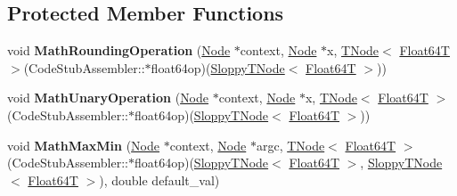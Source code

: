 \subsection*{Protected Member Functions}
\begin{DoxyCompactItemize}
\item 
\mbox{\label{classv8_1_1internal_1_1MathBuiltinsAssembler_aa9c614006a116b3c4ca0d12038b56ad7}} 
void {\bfseries Math\+Rounding\+Operation} (\mbox{\hyperlink{classv8_1_1internal_1_1compiler_1_1Node}{Node}} $\ast$context, \mbox{\hyperlink{classv8_1_1internal_1_1compiler_1_1Node}{Node}} $\ast$x, \mbox{\hyperlink{classv8_1_1internal_1_1compiler_1_1TNode}{T\+Node}}$<$ \mbox{\hyperlink{structv8_1_1internal_1_1Float64T}{Float64T}} $>$(Code\+Stub\+Assembler\+::$\ast$float64op)(\mbox{\hyperlink{classv8_1_1internal_1_1compiler_1_1SloppyTNode}{Sloppy\+T\+Node}}$<$ \mbox{\hyperlink{structv8_1_1internal_1_1Float64T}{Float64T}} $>$))
\item 
\mbox{\label{classv8_1_1internal_1_1MathBuiltinsAssembler_a40526ff7f0ad65458d77ff5043d74491}} 
void {\bfseries Math\+Unary\+Operation} (\mbox{\hyperlink{classv8_1_1internal_1_1compiler_1_1Node}{Node}} $\ast$context, \mbox{\hyperlink{classv8_1_1internal_1_1compiler_1_1Node}{Node}} $\ast$x, \mbox{\hyperlink{classv8_1_1internal_1_1compiler_1_1TNode}{T\+Node}}$<$ \mbox{\hyperlink{structv8_1_1internal_1_1Float64T}{Float64T}} $>$(Code\+Stub\+Assembler\+::$\ast$float64op)(\mbox{\hyperlink{classv8_1_1internal_1_1compiler_1_1SloppyTNode}{Sloppy\+T\+Node}}$<$ \mbox{\hyperlink{structv8_1_1internal_1_1Float64T}{Float64T}} $>$))
\item 
\mbox{\label{classv8_1_1internal_1_1MathBuiltinsAssembler_adf0afcfe28f5a5b0bc9f551c3b665b8f}} 
void {\bfseries Math\+Max\+Min} (\mbox{\hyperlink{classv8_1_1internal_1_1compiler_1_1Node}{Node}} $\ast$context, \mbox{\hyperlink{classv8_1_1internal_1_1compiler_1_1Node}{Node}} $\ast$argc, \mbox{\hyperlink{classv8_1_1internal_1_1compiler_1_1TNode}{T\+Node}}$<$ \mbox{\hyperlink{structv8_1_1internal_1_1Float64T}{Float64T}} $>$(Code\+Stub\+Assembler\+::$\ast$float64op)(\mbox{\hyperlink{classv8_1_1internal_1_1compiler_1_1SloppyTNode}{Sloppy\+T\+Node}}$<$ \mbox{\hyperlink{structv8_1_1internal_1_1Float64T}{Float64T}} $>$, \mbox{\hyperlink{classv8_1_1internal_1_1compiler_1_1SloppyTNode}{Sloppy\+T\+Node}}$<$ \mbox{\hyperlink{structv8_1_1internal_1_1Float64T}{Float64T}} $>$), double default\+\_\+val)
\end{DoxyCompactItemize}
